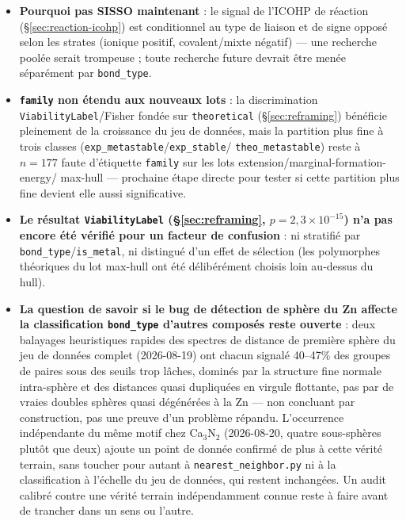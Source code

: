 \documentclass[11pt,a4paper]{article}
\begin{document}
\begin{itemize}
    limite structurelle de ce projet à chaque nouvelle stratification
    (\texttt{bond\_type}, \texttt{is\_metal}) --- voir
    \S\ref{sec:antibonding} pour un exemple concret où un sous-groupe
    $n<15$ ne s'est pas reproduit une fois l'échantillon agrandi.
  \item \textbf{Pourquoi pas SISSO maintenant} : le signal de l'ICOHP de
    réaction (\S\ref{sec:reaction-icohp}) est conditionnel au
    type de liaison et de signe opposé selon les strates (ionique
    positif, covalent/mixte négatif) --- une recherche poolée serait
    trompeuse ; toute recherche future devrait être menée séparément par
    \texttt{bond\_type}.
  \item \textbf{\texttt{family} non étendu aux nouveaux lots} : la
    discrimination \texttt{ViabilityLabel}/Fisher fondée sur
    \texttt{theoretical} (\S\ref{sec:reframing}) bénéficie pleinement de
    la croissance du jeu de données, mais la partition plus fine à trois
    classes (\texttt{exp\_metastable}/\texttt{exp\_stable}/
    \texttt{theo\_metastable}) reste à $n=177$ faute d'étiquette
    \texttt{family} sur les lots extension/marginal-formation-energy/
    max-hull --- prochaine étape directe pour tester si cette partition
    plus fine devient elle aussi significative.
  \item \textbf{Le résultat \texttt{ViabilityLabel} (§\ref{sec:reframing},
    $p=2,3\times10^{-15}$) n'a pas encore été vérifié pour un facteur de
    confusion} : ni stratifié par \texttt{bond\_type}/\texttt{is\_metal},
    ni distingué d'un effet de sélection (les polymorphes théoriques du
    lot max-hull ont été délibérément choisis loin au-dessus du hull).
  \item \textbf{La question de savoir si le bug de détection de sphère
    du Zn affecte la classification \texttt{bond\_type} d'autres
    composés reste ouverte} : deux balayages heuristiques rapides des
    spectres de distance de première sphère du jeu de données complet
    (2026-08-19) ont chacun signalé 40--47\% des groupes de paires sous
    des seuils trop lâches, dominés par la structure fine normale
    intra-sphère et des distances quasi dupliquées en virgule flottante,
    pas par de vraies doubles sphères quasi dégénérées à la Zn ---
    non concluant par construction, pas une preuve d'un problème
    répandu. L'occurrence indépendante du même motif chez Ca$_3$N$_2$
    (2026-08-20, quatre sous-sphères plutôt que deux) ajoute un point de
    donnée confirmé de plus à cette vérité terrain, sans toucher pour
    autant à \texttt{nearest\_neighbor.py} ni à la classification à
    l'échelle du jeu de données, qui restent inchangées. Un audit
    calibré contre une vérité terrain indépendamment connue reste à
    faire avant de trancher dans un sens ou l'autre.
\end{itemize}
\end{document}
